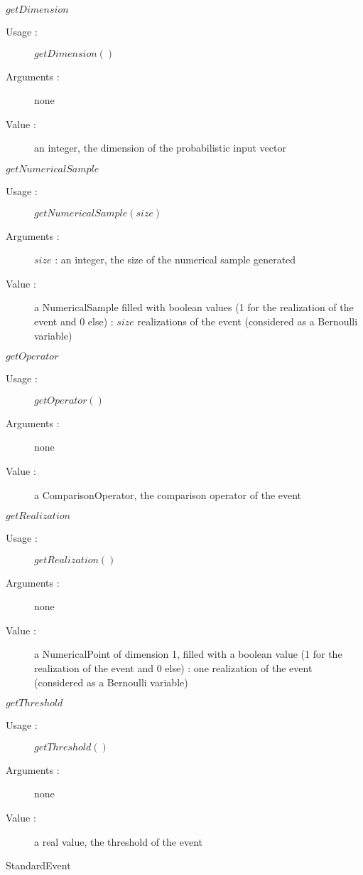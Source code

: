 \begin{description}
\begin{description}
  \item $getDimension$
    \begin{description}
    \item[Usage :] $getDimension()$
    \item[Arguments :] none
    \item[Value :]  an integer, the dimension of the probabilistic input vector
    \end{description}
    \bigskip
  \item $getNumericalSample$
    \begin{description}
    \item[Usage :] $getNumericalSample(size)$
    \item[Arguments :] $size$ : an integer, the size of the numerical sample generated
    \item[Value :]  a NumericalSample filled with boolean values (1 for the realization of the event and 0 else) : $size$ realizations of the event (considered as a Bernoulli variable)
    \end{description}
    \bigskip
  \item $getOperator$
    \begin{description}
    \item[Usage :] $getOperator()$
    \item[Arguments :] none
    \item[Value :]  a ComparisonOperator, the comparison operator of the event
    \end{description}
    \bigskip
  \item $getRealization$
    \begin{description}
    \item[Usage :] $getRealization()$
    \item[Arguments :] none
    \item[Value :]  a NumericalPoint of dimension 1, filled with a boolean value (1 for the realization of the event and 0 else) : one realization of the event (considered as a Bernoulli variable)
    \end{description}
    \bigskip
  \item $getThreshold$
    \begin{description}
    \item[Usage :] $getThreshold()$
    \item[Arguments :] none
    \item[Value :]  a real value, the threshold of the event
    \end{description}
    \bigskip
  \end{description}

\item[Derivative Class :] StandardEvent

\end{description}

